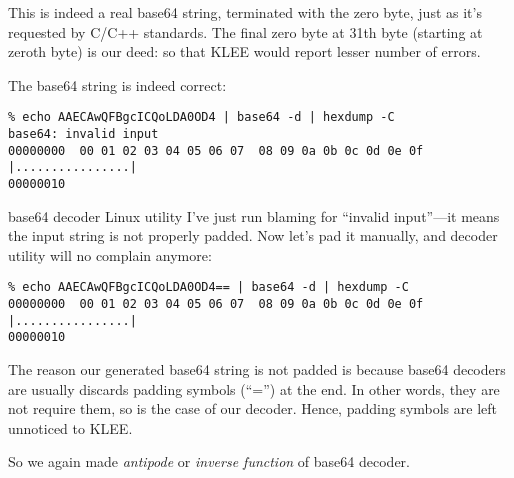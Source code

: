 This is indeed a real base64 string, terminated with the zero byte, just as it's requested by C/C++ standards.
The final zero byte at 31th byte (starting at zeroth byte) is our deed: so that KLEE would report lesser number of errors. %

The base64 string is indeed correct:

\begin{lstlisting}
% echo AAECAwQFBgcICQoLDA0OD4 | base64 -d | hexdump -C
base64: invalid input
00000000  00 01 02 03 04 05 06 07  08 09 0a 0b 0c 0d 0e 0f  |................|
00000010
\end{lstlisting}

base64 decoder Linux utility I've just run blaming for ``invalid input''---it means the input string is not properly padded.
Now let's pad it manually, and decoder utility will no complain anymore:

\begin{lstlisting}
% echo AAECAwQFBgcICQoLDA0OD4== | base64 -d | hexdump -C
00000000  00 01 02 03 04 05 06 07  08 09 0a 0b 0c 0d 0e 0f  |................|
00000010
\end{lstlisting}

The reason our generated base64 string is not padded is because base64 decoders are usually discards padding symbols (``='') at the end.
In other words, they are not require them, so is the case of our decoder.
Hence, padding symbols are left unnoticed to KLEE.

So we again made \emph{antipode} or \emph{inverse function} of base64 decoder.

